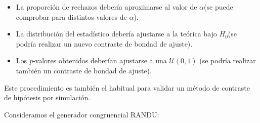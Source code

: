 \documentclass[]{book}
\newenvironment{Shaded}{\begin{snugshade}}{\end{snugshade}}
\newcommand{\KeywordTok}[1]{\textcolor[rgb]{0.13,0.29,0.53}{\textbf{#1}}}
\newcommand{\DataTypeTok}[1]{\textcolor[rgb]{0.13,0.29,0.53}{#1}}
\newcommand{\DecValTok}[1]{\textcolor[rgb]{0.00,0.00,0.81}{#1}}
\newcommand{\StringTok}[1]{\textcolor[rgb]{0.31,0.60,0.02}{#1}}
\newcommand{\CommentTok}[1]{\textcolor[rgb]{0.56,0.35,0.01}{\textit{#1}}}
\newcommand{\OtherTok}[1]{\textcolor[rgb]{0.56,0.35,0.01}{#1}}
\newcommand{\ControlFlowTok}[1]{\textcolor[rgb]{0.13,0.29,0.53}{\textbf{#1}}}
\newcommand{\OperatorTok}[1]{\textcolor[rgb]{0.81,0.36,0.00}{\textbf{#1}}}
\newcommand{\NormalTok}[1]{#1}
\theoremstyle{definition}
\theoremstyle{definition}
\theoremstyle{definition}
\theoremstyle{remark}
\let\BeginKnitrBlock\begin \let\EndKnitrBlock\end
\begin{document}
\begin{itemize}
\item
  La proporción de rechazos debería aproximarse al valor de
  \(\alpha\)(se puede comprobar para distintos valores de \(\alpha\)).
\item
  La distribución del estadístico debería ajustarse a la teórica bajo
  \(H_{0}\)(se podría realizar un nuevo contraste de bondad de ajuste).
\item
  Los \emph{p}-valores obtenidos deberían ajustarse a una
  \(\mathcal{U}\left(0,1\right)\) (se podría realizar también un
  contraste de bondad de ajuste).
\end{itemize}

Este procedimiento es también el habitual para validar un método de
contraste de hipótesis por simulación.

\BeginKnitrBlock{example}
\protect\hypertarget{exm:unnamed-chunk-19}{}{\label{exm:unnamed-chunk-19} }
\EndKnitrBlock{example}

Consideramos el generador congruencial RANDU:

\begin{Shaded}
\end{Shaded}
\end{document}
